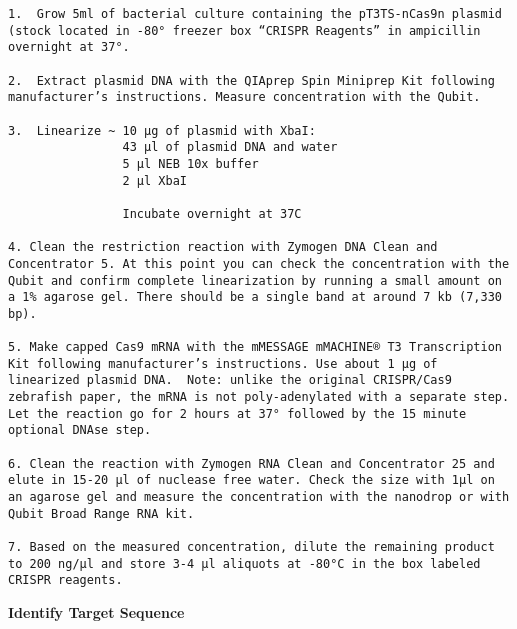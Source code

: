 \documentclass[
  letterpaper,
  DIV=11,
  numbers=noendperiod]{scrreprt}
\begin{document}
\begin{verbatim}
1.  Grow 5ml of bacterial culture containing the pT3TS-nCas9n plasmid (stock located in -80° freezer box “CRISPR Reagents” in ampicillin overnight at 37°.  

2.  Extract plasmid DNA with the QIAprep Spin Miniprep Kit following manufacturer’s instructions. Measure concentration with the Qubit. 

3.  Linearize ~ 10 µg of plasmid with XbaI: 
                43 µl of plasmid DNA and water 
                5 µl NEB 10x buffer 
                2 µl XbaI 
                          
                Incubate overnight at 37C 

4. Clean the restriction reaction with Zymogen DNA Clean and Concentrator 5. At this point you can check the concentration with the Qubit and confirm complete linearization by running a small amount on a 1% agarose gel. There should be a single band at around 7 kb (7,330 bp). 

5. Make capped Cas9 mRNA with the mMESSAGE mMACHINE® T3 Transcription Kit following manufacturer’s instructions. Use about 1 µg of linearized plasmid DNA.  Note: unlike the original CRISPR/Cas9 zebrafish paper, the mRNA is not poly-adenylated with a separate step. Let the reaction go for 2 hours at 37° followed by the 15 minute optional DNAse step. 

6. Clean the reaction with Zymogen RNA Clean and Concentrator 25 and elute in 15-20 µl of nuclease free water. Check the size with 1µl on an agarose gel and measure the concentration with the nanodrop or with Qubit Broad Range RNA kit. 

7. Based on the measured concentration, dilute the remaining product to 200 ng/µl and store 3-4 µl aliquots at -80°C in the box labeled CRISPR reagents.  
\end{verbatim}

\textbf{Identify Target Sequence}
\end{document}
